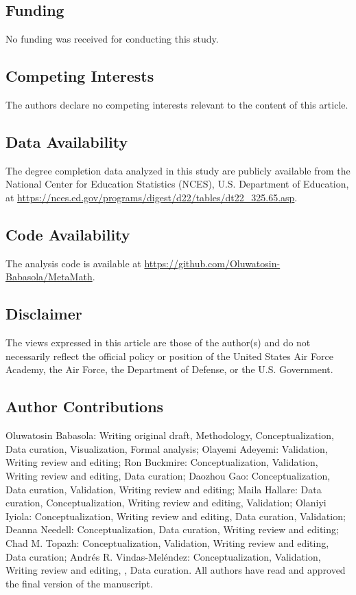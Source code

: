 \documentclass[3p]{elsarticle}%
\theoremstyle{definition}
\begin{document}
 \subsection*{Funding}
   \noindent No funding was received for conducting this study.

   \subsection*{Competing Interests}
   \noindent The authors declare no competing interests relevant to the content of this article.

 \subsection*{Data Availability}
  \noindent The degree completion data analyzed in this study are publicly available from the National Center for Education Statistics (NCES), U.S. Department of Education, at \url{https://nces.ed.gov/programs/digest/d22/tables/dt22_325.65.asp}.

  \subsection*{Code Availability}
  \noindent The analysis code is available at \url{https://github.com/Oluwatosin-Babasola/MetaMath}.

  \subsection*{Disclaimer}  
  \noindent The views expressed in this article are those of the author(s) and do not necessarily reflect the official policy or position of the United States Air Force Academy, the Air Force, the Department of Defense, or the U.S. Government.

 \subsection*{Author Contributions}
 \noindent Oluwatosin Babasola: Writing original draft, Methodology, Conceptualization, Data curation, Visualization, Formal analysis; Olayemi Adeyemi: Validation, Writing review and editing; Ron Buckmire: Conceptualization, Validation, Writing review and editing, Data curation; Daozhou Gao: Conceptualization, Data curation, Validation, Writing review and editing; Maila Hallare: Data curation, Conceptualization, Writing review and editing, Validation; Olaniyi Iyiola: Conceptualization, Writing review and editing, Data curation, Validation; Deanna Needell: Conceptualization, Data curation, Writing review and editing; Chad M. Topazh: Conceptualization, Validation, Writing review and editing, Data curation; Andrés R. Vindas-Meléndez: Conceptualization, Validation, Writing review and editing, , Data curation. All authors have read and approved the final
version of the manuscript.


\end{document}
